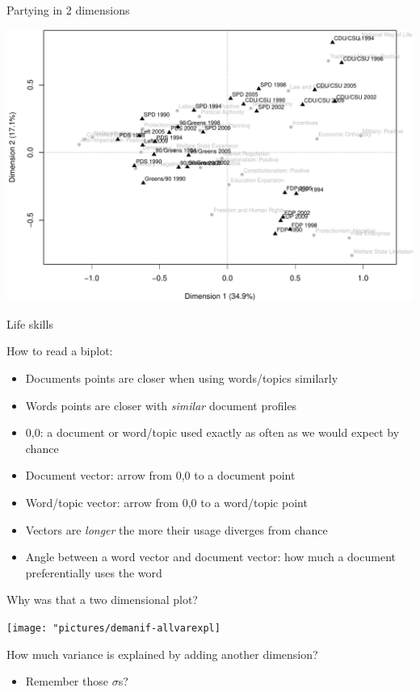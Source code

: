 \documentclass{hertieteaching}
\begin{document}
\begin{frame}{Partying in 2 dimensions}

\centerline{\includegraphics[scale=0.5]{pictures/grey-just-rile-crop}}

\end{frame}
\begin{frame}{Life skills}

How to read a biplot:
\begin{itemize}
  \item Documents points are closer when using words/topics similarly
  \item Words points are closer with \textit{similar} document profiles
  \item 0,0: a document or word/topic used exactly as often as we would expect by chance
  \item Document vector: arrow from 0,0 to a document point
  \item Word/topic vector: arrow from 0,0 to a word/topic point
  \item Vectors are \textit{longer} the more their usage diverges from chance
  \item Angle between a word vector and document vector: how much a
    document preferentially uses the word
\end{itemize}


\end{frame}

\begin{frame}{Why was that a two dimensional plot?}

\bigskip
\centerline{\texttt{[image: "pictures/demanif-allvarexpl]}}

How much variance is explained by adding another dimension?
\begin{itemize}
  \item Remember those $\sigma$s?
\end{itemize}

\end{frame}
\end{document}
